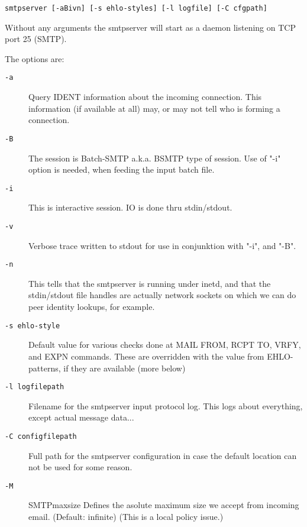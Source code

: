 {\tt smtpserver [-aBivn] [-s ehlo-styles] [-l logfile] [-C cfgpath]}

Without any arguments the  smtpserver  will start as a daemon
listening on TCP port 25 (SMTP).

The options are:

\begin{description}
\item[{\tt -a}] \mbox{}

Query IDENT information about the incoming connection. This information (if available at all) may, or may not tell who is forming a connection.

\item[{\tt -B}] \mbox{}

The session is Batch-SMTP a.k.a. BSMTP type of session. Use of "-i" option is needed, when feeding the input batch file.

\item[{\tt -i}] \mbox{}

This is interactive session.  IO is done thru stdin/stdout.

\item[{\tt -v}] \mbox{}

Verbose trace written to stdout for use in conjunktion with "-i", and "-B".

\item[{\tt -n}] \mbox{}

This tells that the smtpserver is running under inetd, and that the stdin/stdout file handles are actually network sockets on which we can do peer identity lookups, for example.

\item[{\tt -s ehlo-style}] \mbox{}

Default value for various checks done at MAIL FROM, RCPT TO, VRFY, and EXPN commands. These are overridden with the value from EHLO-patterns, if they are available (more below)

\item[{\tt -l logfilepath}] \mbox{}

Filename for the smtpserver input protocol log. This logs about everything, except actual message data...

\item[{\tt -C configfilepath}] \mbox{}

Full path for the smtpserver configuration in case the default location can not be used for some reason.

\item[{\tt -M}] \mbox{}

SMTPmaxsize Defines the asolute maximum size we accept from incoming email. (Default: infinite) (This is a local policy issue.)

\end{description}


